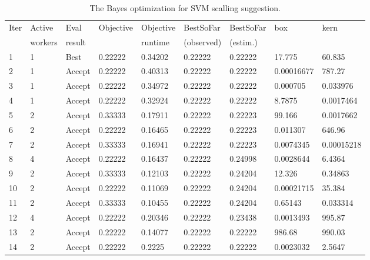 \documentclass[5p]{elsarticle}
\begin{document}
\begin{frontmatter}
\begin{table}[h!]
  \small
  \begin{center}
    \caption{The Bayes optimization for SVM scalling suggestion.}
    \label{tab:table_3}
    \begin{tabular}{l | l | l|l|l|l|l|l|l}
\hline
Iter & Active  & Eval& Objective& Objective   & BestSoFar & BestSoFar&  box & kern \\
 & workers & result & & runtime     & (observed)  & (estim.)    &              &    \\
1 &       1 & Best   &     0.22222 &     0.34202 &     0.22222 &     0.22222 &       17.775 &       60.835 \\
2 &       1 & Accept &     0.22222 &     0.40313 &     0.22222 &     0.22222 &   0.00016677 &       787.27 \\
3 &       1  & Accept  &  0.22222  &     0.34972 & 0.22222  &     0.22222  & 0.000705  &     0.033976 \\
4 &       1 & Accept &     0.22222 &     0.32924 &     0.22222 &     0.22222 &       8.7875 &    0.0017464 \\
5 &       2 & Accept &     0.33333 &     0.17911 &     0.22222 &     0.22223 &       99.166 &    0.0017662 \\
6 &       2 & Accept &     0.22222 &     0.16465 &     0.22222 &     0.22223 &     0.011307 &       646.96 \\
7 &       2 & Accept &     0.33333 &     0.16941 &     0.22222 &     0.22223 &    0.0074345 &   0.00015218 \\
8 &       4 & Accept &     0.22222 &     0.16437 &     0.22222 &     0.24998 &    0.0028644 &       6.4364 \\
9 &       2 & Accept &     0.33333 &     0.12103 &     0.22222 &     0.24204 &       12.326 &      0.34863 \\
10 &       2 & Accept &     0.22222 &     0.11069 &     0.22222 &     0.24204 &   0.00021715 &       35.384 \\
11 &       2 & Accept &     0.33333 &     0.10455 &     0.22222 &     0.24204 &      0.65143 &     0.033314 \\
12 &       4 & Accept &     0.22222 &     0.20346 &     0.22222 &     0.23438 &    0.0013493 &       995.87 \\
13 &       2 & Accept &     0.22222 &     0.14077 &     0.22222 &     0.22222 &       986.68 &       990.03 \\
14 &       2 & Accept &     0.22222 &      0.2225 &     0.22222 &     0.22222 &    0.0023032 &       2.5647 \\

\end{tabular}
\end{center}
\end{table}
\end{frontmatter}
\end{document}

